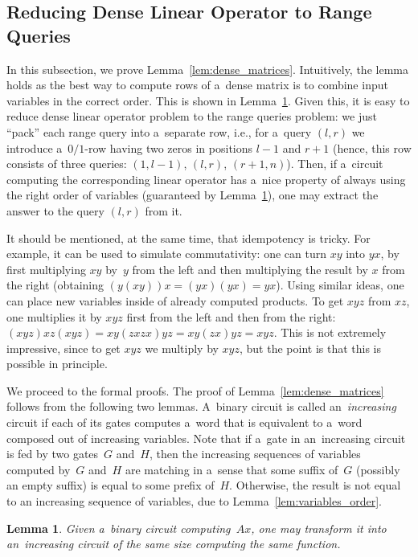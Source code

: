 \documentclass[11pt,letterpaper]{article}
\newtheorem{lemma}{Lemma}
\begin{document}
\subsection{Reducing Dense Linear Operator to Range Queries}
In this subsection, we prove Lemma~\ref{lem:dense_matrices}. Intuitively, the lemma holds as the best way to compute rows of a~dense matrix is to combine input variables in the correct order. This is shown in Lemma~\ref{lemma:correctorder}. Given this, it is easy to reduce dense linear operator problem to the range queries problem: we just ``pack'' each range query into a~separate row, i.e., for a~query $(l,r)$ we introduce a~$0/1$-row having two zeros in positions $l-1$ and $r+1$ (hence, this row consists of three queries: $(1,l-1)$, $(l,r)$, $(r+1,n)$). Then, if a~circuit computing the corresponding linear operator has a~nice property of always using the right order of variables (guaranteed by Lemma~\ref{lemma:correctorder}), one may extract the answer to the query $(l,r)$ from it.

It should be mentioned, at the same time, that idempotency is tricky. For example, it can be used to simulate commutativity: one can turn $xy$ into $yx$, by first multiplying $xy$ by~$y$ from the left and then multiplying the result by $x$ from the right (obtaining $(y(xy))x=(yx)(yx)=yx$). Using similar ideas, one can place new variables inside of already computed products. To get $xyz$ from $xz$, one multiplies it by $xyz$ first from the left and then from the right: $(xyz)xz(xyz)=xy(zxzx)yz=xy(zx)yz=xyz$.
This is not extremely impressive, since to get $xyz$ we multiply by $xyz$, but the point is that this is possible in principle.

We proceed to the formal proofs. The proof of Lemma~\ref{lem:dense_matrices} follows from the following two lemmas. A~binary circuit is called an~{\em increasing} circuit if each of its gates computes a~word that is equivalent to a~word composed out of increasing variables.
Note that if a~gate in an~increasing circuit is fed by two gates~$G$ and~$H$, then the increasing sequences of variables computed by~$G$ and~$H$ are matching in a~sense that some suffix of~$G$ (possibly an empty suffix) is equal to some prefix of~$H$. Otherwise, the result is not equal to an increasing sequence of variables, due to Lemma~\ref{lem:variables_order}.

\begin{lemma}\label{lemma:correctorder}
Given a~binary circuit computing~$Ax$, one may transform it into an~increasing circuit of the same size computing the same function.
\end{lemma}
\end{document}

